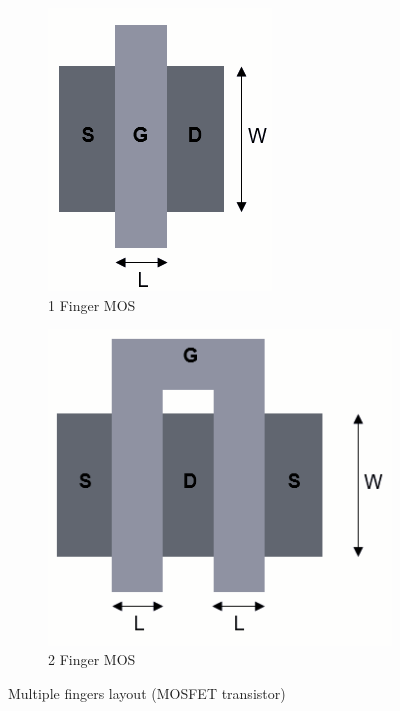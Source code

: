 \documentclass[a4paper,12pt]{article}
\begin{document}
	\begin{figure}[H]
		\centering
		\begin{subfigure}[t]{0.49\textwidth}
			\centering
			\includegraphics[width=.75\linewidth]{images/9.2}
			\caption{1 Finger MOS}
		\end{subfigure}
		\hfill
		\begin{subfigure}[t]{0.49\textwidth}
			\centering
			\includegraphics[width=1\linewidth]{images/10.3}
			\caption{2 Finger MOS}
		\end{subfigure}
		
		\caption{Multiple fingers layout (MOSFET transistor)}
		\label{fig:9}
	\end{figure}
\end{document}
